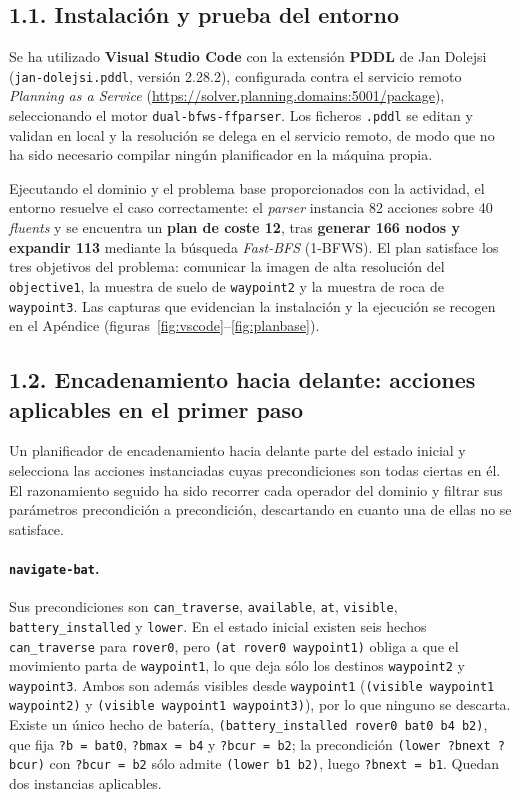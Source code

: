 \documentclass[12pt,a4paper]{article}
\begin{document}
\subsection{1.1. Instalaci\'on y prueba del entorno}

Se ha utilizado \textbf{Visual Studio Code} con la extensi\'on \textbf{PDDL}
de Jan Dolejsi (\texttt{jan-dolejsi.pddl}, versi\'on 2.28.2), configurada
contra el servicio remoto \emph{Planning as a Service}
(\url{https://solver.planning.domains:5001/package}), seleccionando el motor
\texttt{dual-bfws-ffparser}. Los ficheros \texttt{.pddl} se editan y validan
en local y la resoluci\'on se delega en el servicio remoto, de modo que no
ha sido necesario compilar ning\'un planificador en la m\'aquina propia.

Ejecutando el dominio y el problema base proporcionados con la actividad, el
entorno resuelve el caso correctamente: el \emph{parser} instancia
82 acciones sobre 40 \emph{fluents} y se encuentra un
\textbf{plan de coste 12}, tras \textbf{generar 166 nodos y expandir 113}
mediante la b\'usqueda \emph{Fast-BFS} (1-BFWS). El plan satisface los tres
objetivos del problema: comunicar la imagen de alta resoluci\'on del
\texttt{objective1}, la muestra de suelo de \texttt{waypoint2} y la muestra
de roca de \texttt{waypoint3}. Las capturas que evidencian la instalaci\'on
y la ejecuci\'on se recogen en el Ap\'endice
(figuras~\ref{fig:vscode}--\ref{fig:planbase}).

\subsection{1.2. Encadenamiento hacia delante: acciones aplicables en el
primer paso}

Un planificador de encadenamiento hacia delante parte del estado inicial y
selecciona las acciones instanciadas cuyas precondiciones son todas ciertas
en \'el. El razonamiento seguido ha sido recorrer cada operador del dominio
y filtrar sus par\'ametros precondici\'on a precondici\'on, descartando en
cuanto una de ellas no se satisface.

\paragraph{\texttt{navigate-bat}.}
Sus precondiciones son \texttt{can\_traverse}, \texttt{available},
\texttt{at}, \texttt{visible}, \texttt{battery\_installed} y \texttt{lower}.
En el estado inicial existen seis hechos \texttt{can\_traverse} para
\texttt{rover0}, pero \texttt{(at rover0 waypoint1)} obliga a que el
movimiento parta de \texttt{waypoint1}, lo que deja s\'olo los destinos
\texttt{waypoint2} y \texttt{waypoint3}. Ambos son adem\'as visibles desde
\texttt{waypoint1} (\texttt{(visible waypoint1 waypoint2)} y
\texttt{(visible waypoint1 waypoint3)}), por lo que ninguno se descarta.
Existe un \'unico hecho de bater\'ia,
\texttt{(battery\_installed rover0 bat0 b4 b2)}, que fija
\texttt{?b\,=\,bat0}, \texttt{?bmax\,=\,b4} y \texttt{?bcur\,=\,b2};
la precondici\'on \texttt{(lower ?bnext ?bcur)} con \texttt{?bcur\,=\,b2}
s\'olo admite \texttt{(lower b1 b2)}, luego \texttt{?bnext\,=\,b1}. Quedan
dos instancias aplicables.
\end{document}
